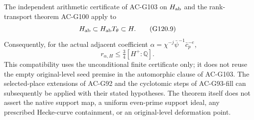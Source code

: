\begin{theorem}
The independent arithmetic certificate of AC-G103 on $H_{\rm ab}$
and the rank-transport theorem AC-G100 apply to
\[
               H_{\rm ab}\subset H_{\rm ab}T_\theta\subset H.
                                                                    \tag{G120.9}
\]
Consequently, for the actual adjacent coefficient
$\alpha=\chi^{-j}\bar\psi^{-1}\bar c_p^{-e}$,
\[
               r_{\alpha,H}\le\tfrac34[H^+:\mathbb Q].             \tag{G120.10}
\]
This compatibility uses the unconditional finite certificate only;
it does not reuse the empty original-level seed premise in the
automorphic clause of AC-G103.
The selected-place extensions of AC-G92 and the cyclotomic steps of
AC-G93-fill can subsequently be applied with their stated hypotheses.
The theorem itself does not assert the native support map, a uniform
even-prime support ideal, any prescribed Hecke-curve containment,
or an original-level deformation point.
\end{theorem}

